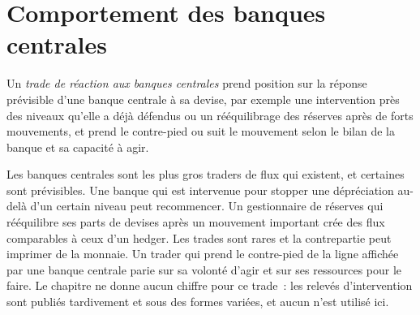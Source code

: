 \begin{omfigure}

\label{fig:s2:fx-flow-strategies:quintiles}
\end{omfigure}

\section{Comportement des banques centrales}

\begin{definition}\label{def:s2:fx-flow-strategies:cb}
Un \emph{trade de réaction aux banques centrales} prend position sur la réponse prévisible d'une banque centrale à sa devise, par exemple
une intervention près des niveaux qu'elle a déjà défendus ou un rééquilibrage des réserves après de forts mouvements, et prend le contre-pied ou suit le mouvement selon le
bilan de la banque et sa capacité à agir.
\end{definition}

Les banques centrales sont les plus gros traders de flux qui existent, et certaines sont prévisibles. Une banque qui est intervenue pour stopper une dépréciation au-delà d'un certain niveau
peut recommencer. Un gestionnaire de réserves qui rééquilibre ses parts de devises après un mouvement important crée des flux comparables à ceux d'un hedger. Les trades sont rares et
la contrepartie peut imprimer de la monnaie. Un trader qui prend le contre-pied de la ligne affichée par une banque centrale parie sur sa volonté d'agir et sur ses ressources pour le faire. Le chapitre
ne donne aucun chiffre pour ce trade~: les relevés d'intervention sont publiés tardivement et sous des formes variées, et aucun n'est utilisé ici.

